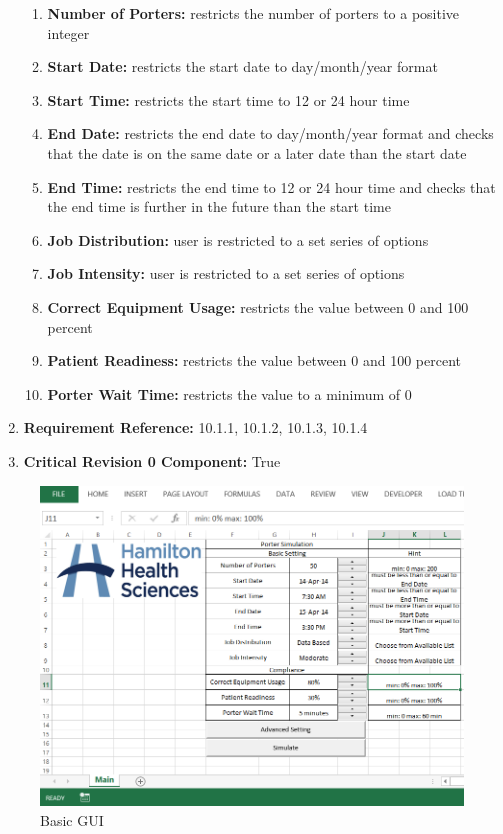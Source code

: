 \documentclass[paper=letter, fontsize=10pt]{scrartcl}
\numberwithin{equation}{section}		%
\numberwithin{figure}{section}			%
\numberwithin{table}{section}				%
\begin{document}
\begin{enumerate}[]
	\begin{enumerate}[]
		\item \textbf{Number of Porters:} restricts the number of porters to a positive integer 
		\item \textbf{Start Date:} restricts the start date to day/month/year format
		\item \textbf{Start Time:} restricts the start time to 12 or 24 hour time
		\item \textbf{End Date:} restricts the end date to day/month/year format and checks that the date is on the same date or a later date than the start date
		\item \textbf{End Time:} restricts the end time to 12 or 24 hour time and checks that the end time is further in the future than the start time
		\item \textbf{Job Distribution:} user is restricted to a set series of options
		\item \textbf{Job Intensity:} user is restricted to a set series of options
		\item \textbf{Correct Equipment Usage:} restricts the value between 0 and 100 percent 
		\item \textbf{Patient Readiness:} restricts the value between 0 and 100 percent
		\item \textbf{Porter Wait Time:} restricts the value to a minimum of 0		
	\end{enumerate}
	\item \textbf{Requirement Reference:} 10.1.1, 10.1.2, 10.1.3, 10.1.4
	\item \textbf{Critical Revision 0 Component:} True
\end{enumerate}

\newpage
\begin{figure}[H]
	\begin{center}
		\includegraphics[width=1\columnwidth]{../GUI/GUI_Mockups/BasicGUI.png}
		\caption{Basic GUI}
	\end{center}
\end{figure}
\newpage
\end{document}
